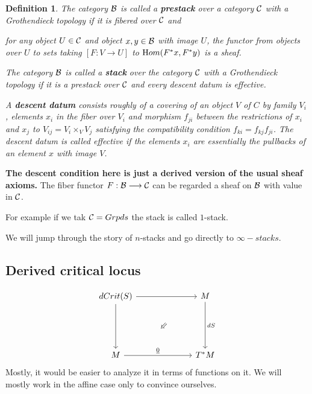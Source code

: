 \documentclass[11pt]{article}
\newcommand{\Swarrow}{\mathbin{\rotatebox[origin=c]{45}{$\Leftarrow$}}}
\newtheorem{dfn}[thm]{Definition}
\renewcommand{\hom}{{\text Hom}}
\newcommand{\calb}{{\cal B}}
\newcommand{\calc}{{\cal C}}
\newcommand{\lrta}{\longrightarrow}
\begin{document}
\begin{dfn}
The category $\calb$ is called a \textbf{prestack} over a category $\calc$ with a Grothendieck topology if it is fibered over $\calc$ and 

for any object $U\in\calc$ and object $x,y\in\calb$ with image $U$, the functor from objects over $U$ to sets taking $[F:V\lrta U]$ to $\hom(F^*x, F^*y)$ is a sheaf.

The category $\calb$ is called a \textbf{stack} over the category $\calc$ with a Grothendieck topology if it is a prestack over $\calc$ and every descent datum is effective.

 A \textbf{descent datum} consists roughly of a covering of an object $V$ of $C$ by family $V_i$, elements $x_i$ in the fiber over $V_i$ and morphism $f_{ji}$ between the restrictions of $x_i$ and $x_j$ to $V_{ij}=V_i\times_V V_{j}$ satisfying the compatibility condition $f_{ki}=f_{kj}f_{ji}$. The descent datum is called effective if the elements $x_i$ are essentially the pullbacks of an element $x$ with image $V$.
\end{dfn}
\textbf{The descent condition here is just a derived version of the usual sheaf axioms.} The fiber functor $F:\calb\lrta \calc$ can be regarded a sheaf on $\calb$ with value in $\calc$.

For example if we tak $\calc=Grpds$ the stack is called $1$-stack.

We will jump through the story of $n$-stacks and go directly to $\infty-stacks$.

\subsection{Derived critical locus}
$$
\begin{tikzcd}
dCrit(S) \arrow[rr] \arrow[dd] &  & M \arrow[dd, "dS"] \\
 & \Swarrow &  \\
M \arrow[rr, "\underline{0}"] &  & T^*M
\end{tikzcd}
$$
Mostly, it would be easier to analyze it in terms of functions on it. We will mostly work in the affine case only to convince ourselves.
\end{document}
